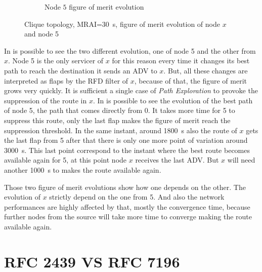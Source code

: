 \begin{figure}[h]
\begin{subfigure}[b]{0.494\textwidth}
         \caption{Node $5$ figure of merit evolution}
         \label{fig:clique_node5_30}
     \end{subfigure}
		\caption{Clique topology, \ac{MRAI}=\SI{30}{\second}, figure of merit evolution
		of node \(x\) and node \num{5}}
        \label{fig:RFD_2439_figure_of_merit}
\end{figure}

In  is possible to see the two different
evolution, one of node \num{5} and the other from $x$.
Node \num{5} is the only servicer of $x$ for this reason every time it changes
its best path to reach the destination it sends an \ac{ADV} to $x$.
But, all these changes are interpreted as flaps by the \ac{RFD} filter of $x$,
because of that, the figure of merit grows very quickly.
It is sufficient a single case of \textit{Path Exploration} to provoke the
suppression of the route in $x$.
In  is possible to see the evolution of the best path
of node \num{5}, the path that comes directly from \num{0}.
It takes more time for \num{5} to suppress this route, only the last flap
makes the figure of merit reach the suppression threshold.
In the same instant, around \SI{1800}{\second} also the route of $x$ gets the
last flap from \num{5} after that there is only one more point of variation
around \SI{3000}{\second}.
This last point correspond to the instant where the best route becomes available
again for \num{5}, at this point node $x$ receives the last \ac{ADV}.
But $x$ will need another \SI{1000}{\second} to makes the route available again.

Those two figure of merit evolutions show how one depends on the other.
The evolution of $x$ strictly depend on the one from \num{5}.
And also the network performances are highly affected by that, mostly the convergence
time, because further nodes from the source will take more time to converge making
the route available again.

\section{RFC 2439 VS RFC 7196}
\label{sec:rfd_2439_Vs_7196}


